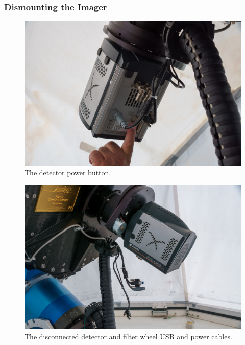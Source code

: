 \subsubsection{Dismounting the Imager}

\begin{figure}
\begin{center}
\includegraphics[width=0.8\linewidth]{figures/huitzi-detector-power-button.jpg}
\end{center}
\caption{The detector power button.}
\label{figure:huitzi-detector-power-button}
\end{figure}

\begin{figure}
\begin{center}
\includegraphics[width=0.8\linewidth]{figures/huitzi-cables-disconnected.jpg}
\end{center}
\caption{The disconnected detector and filter wheel USB and power cables.}
\label{figure:huitzi-cables-disconnected}
\end{figure}

